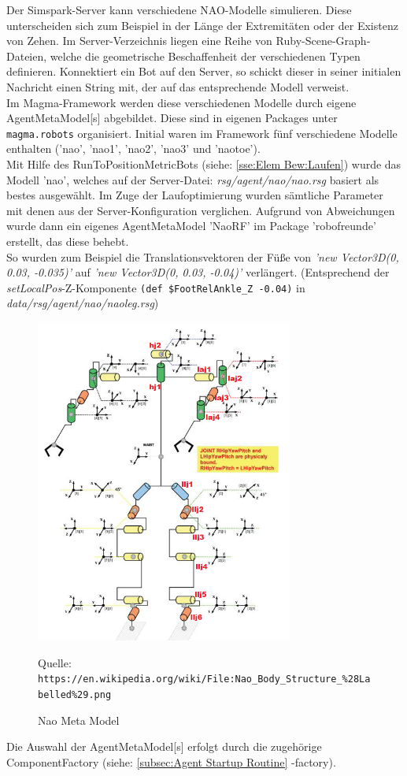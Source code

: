 Der Simspark-Server kann verschiedene NAO-Modelle simulieren. Diese unterscheiden sich zum
Beispiel in der Länge der Extremitäten oder der Existenz von Zehen. Im Server-Verzeichnis
liegen eine Reihe von Ruby-Scene-Graph-Dateien, welche die geometrische Beschaffenheit der
verschiedenen Typen definieren. Konnektiert ein Bot auf den Server, so schickt dieser in seiner initialen Nachricht einen String mit, der auf das entsprechende Modell verweist.\\

Im Magma-Framework werden diese verschiedenen Modelle durch eigene AgentMetaModel[s]
abgebildet. Diese sind in eigenen Packages unter \texttt{magma.robots} organisiert. Initial waren im Framework fünf verschiedene Modelle enthalten ('nao', 'nao1', 'nao2', 'nao3' und 'naotoe').\\
Mit Hilfe des RunToPositionMetricBots (siehe: \ref{sse:Elem Bew:Laufen}) wurde das Modell 'nao', welches auf der Server-Datei: \textit{rsg/agent/nao/nao.rsg} basiert als bestes ausgewählt. Im Zuge der Laufoptimierung wurden sämtliche Parameter mit denen aus der Server-Konfiguration verglichen.
Aufgrund von Abweichungen wurde dann ein eigenes AgentMetaModel 'NaoRF' im Package
'robofreunde' erstellt, das diese behebt.\\
So wurden zum Beispiel die Translationsvektoren der Füße von \textit{'new Vector3D(0, 0.03, -0.035)'}
auf \textit{'new Vector3D(0, 0.03, -0.04)'} verlängert. (Entsprechend der \textit{setLocalPos}-Z-Komponente
\texttt{(def \$FootRelAnkle\_Z -0.04)} in \textit{data/rsg/agent/nao/naoleg.rsg})

\begin{figure}[H]
	\centering
	\includegraphics[width=240pt]{Grafiken/MetaModel/Nao_Body_Structure}
	\caption{Nao Meta Model}{Quelle: \texttt{https://en.wikipedia.org/wiki/File:Nao\_Body\_Structure\_\%28Labelled\%29.png}}
	\label{fig:dribblerekt}
\end{figure}

Die Auswahl der AgentMetaModel[s] erfolgt durch die zugehörige ComponentFactory (siehe: 
\ref{subsec:Agent Startup Routine} -factory). 